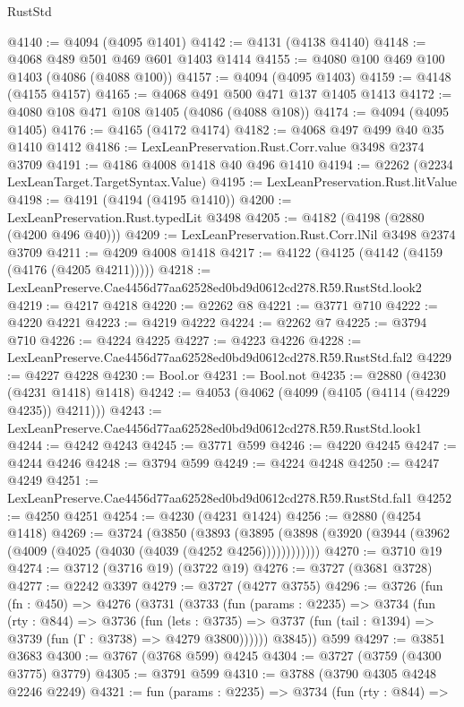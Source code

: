 \begin{lexlean}{RustStd}
\begin{coremodule}
@4140 := @4094 (@4095 @1401)
@4142 := @4131 (@4138 @4140)
@4148 := @4068 @489 @501 @469 @601 @1403 @1414
@4155 := @4080 @100 @469 @100 @1403 (@4086 (@4088 @100))
@4157 := @4094 (@4095 @1403)
@4159 := @4148 (@4155 @4157)
@4165 := @4068 @491 @500 @471 @137 @1405 @1413
@4172 := @4080 @108 @471 @108 @1405 (@4086 (@4088 @108))
@4174 := @4094 (@4095 @1405)
@4176 := @4165 (@4172 @4174)
@4182 := @4068 @497 @499 @40 @35 @1410 @1412
@4186 := LexLeanPreservation.Rust.Corr.value @3498 @2374 @3709
@4191 := @4186 @4008 @1418 @40 @496 @1410
@4194 := @2262 (@2234 LexLeanTarget.TargetSyntax.Value)
@4195 := LexLeanPreservation.Rust.litValue
@4198 := @4191 (@4194 (@4195 @1410))
@4200 := LexLeanPreservation.Rust.typedLit @3498
@4205 := @4182 (@4198 (@2880 (@4200 @496 @40)))
@4209 := LexLeanPreservation.Rust.Corr.lNil @3498 @2374 @3709
@4211 := @4209 @4008 @1418
@4217 := @4122 (@4125 (@4142 (@4159 (@4176 (@4205 @4211)))))
@4218 := LexLeanPreserve.Cae4456d77aa62528ed0bd9d0612cd278.R59.RustStd.look2
@4219 := @4217 @4218
@4220 := @2262 @8
@4221 := @3771 @710
@4222 := @4220 @4221
@4223 := @4219 @4222
@4224 := @2262 @7
@4225 := @3794 @710
@4226 := @4224 @4225
@4227 := @4223 @4226
@4228 := LexLeanPreserve.Cae4456d77aa62528ed0bd9d0612cd278.R59.RustStd.fal2
@4229 := @4227 @4228
@4230 := Bool.or
@4231 := Bool.not
@4235 := @2880 (@4230 (@4231 @1418) @1418)
@4242 := @4053 (@4062 (@4099 (@4105 (@4114 (@4229 @4235)) @4211)))
@4243 := LexLeanPreserve.Cae4456d77aa62528ed0bd9d0612cd278.R59.RustStd.look1
@4244 := @4242 @4243
@4245 := @3771 @599
@4246 := @4220 @4245
@4247 := @4244 @4246
@4248 := @3794 @599
@4249 := @4224 @4248
@4250 := @4247 @4249
@4251 := LexLeanPreserve.Cae4456d77aa62528ed0bd9d0612cd278.R59.RustStd.fal1
@4252 := @4250 @4251
@4254 := @4230 (@4231 @1424)
@4256 := @2880 (@4254 @1418)
@4269 := @3724
    (@3850
      (@3893 (@3895 (@3898 (@3920 (@3944 (@3962 (@4009 (@4025 (@4030 (@4039 (@4252 @4256))))))))))))
@4270 := @3710 @19
@4274 := @3712 (@3716 @19) (@3722 @19)
@4276 := @3727 (@3681 @3728)
@4277 := @2242 @3397
@4279 := @3727 (@4277 @3755)
@4296 := @3726
    (fun (fn : @450) =>
    @4276
      (@3731
        (@3733
          (fun (params : @2235) =>
          @3734
            (fun (rty : @844) =>
            @3736
              (fun (lets : @3735) =>
              @3737 (fun (tail : @1394) => @3739 (fun (Γ : @3738) => @4279 @3800))))))
        @3845))
    @599
@4297 := @3851 @3683
@4300 := @3767 (@3768 @599) @4245
@4304 := @3727 (@3759 (@4300 @3775) @3779)
@4305 := @3791 @599
@4310 := @3788 (@3790 @4305 @4248 @2246 @2249)
@4321 := fun (params : @2235) =>
  @3734
    (fun (rty : @844) =>

\end{coremodule}
\end{lexlean}
